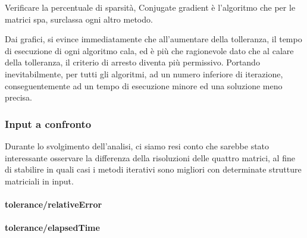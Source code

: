 
Verificare la percentuale di sparsità, Conjugate gradient è l'algoritmo che per le matrici spa, surclassa ogni altro metodo.

Dai grafici, si evince immediatamente che all'aumentare della tolleranza, il tempo di esecuzione di ogni algoritmo cala, ed è più che ragionevole dato che al calare della tolleranza, il criterio di arresto diventa più permissivo.
Portando inevitabilmente, per tutti gli algoritmi, ad un numero inferiore di iterazione, conseguentemente ad un tempo di esecuzione minore ed una soluzione meno precisa.


\subsubsection{Input a confronto}
Durante lo svolgimento dell'analisi, ci siamo resi conto che sarebbe stato interessante osservare la differenza della risoluzioni delle quattro matrici, al fine di stabilire in quali casi i metodi iterativi sono migliori con determinate strutture matriciali in input.

\paragraph{tolerance/relativeError}


\paragraph{tolerance/elapsedTime}





